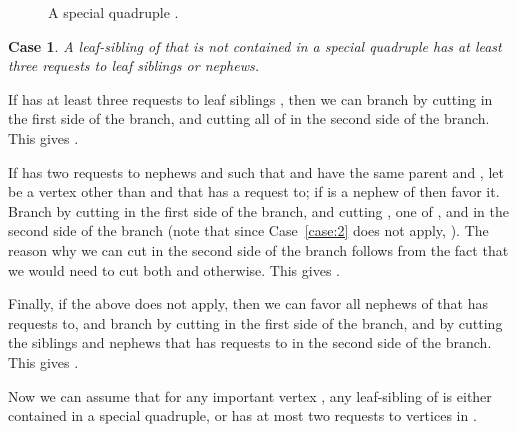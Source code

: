 \documentclass[11pt]{article}
\newcommand{\important}[2] {\node[name=#1, minimum size=8mm] {#2};}
\newcommand{\leaf}[2] {\node[rectangle,name=#1, minimum size=5mm] {#2};}
\newtheorem{case}[theorem]{Case}
\begin{document}
\begin{figure}
\begin{center}
\end{center}

\caption{A special quadruple .} \label{fig:quadruple}
\end{figure}


\begin{case}\label{case:70}
A leaf-sibling  of  that is not contained in a special quadruple has at least three requests to leaf siblings or nephews.
\end{case}

If  has at least three requests to leaf siblings , then we can branch by cutting  in the first side of the branch, and cutting all of  in the second side of the branch. This gives .

If  has two requests to nephews  and  such that  and  have the same parent  and , let  be a vertex other than  and  that  has a request to; if  is a nephew of  then favor it. Branch by cutting  in the first side of the branch, and cutting , one of , and  in the second side of the branch (note that since Case~\ref{case:2} does not apply, ). The reason why we can cut  in the second side of the branch follows from the fact that we would need to cut both  and  otherwise. This gives .

Finally, if the above does not apply, then we can favor all nephews of  that  has requests to, and branch by cutting  in the first side of the branch, and by cutting the siblings and nephews that  has requests to in the second side of the branch. This gives .

Now we can assume that for any important vertex , any leaf-sibling of  is either contained in a special quadruple, or has at most two requests to vertices in .
\end{document}

